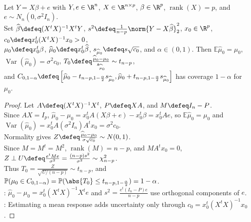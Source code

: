\begin{proposition} \label{prop:linear-model-mean-response-interval} \\
Let $Y=X\beta+e$ with $Y,e\in\R^n$, $X\in\R^{n\times p}$, $\beta\in\R^p$, $\operatorname{rank}(X)=p$, and $e\sim N_n(0,\sigma^2I_n)$.\\
Set $\widehat{\beta}\defeq(X^tX)^{-1}X^tY$, $s^2\defeq\frac{1}{n-p}\norm{Y-X\widehat{\beta}}_2^2$, $x_0\in\R^p$, $c_0\defeq x_0^t(X^tX)^{-1}x_0>0$,\\
$\mu_0\defeq x_0^t\beta$, $\widehat{\mu}_0\defeq x_0^t\widehat{\beta}$, $s_{\widehat{\mu}_0}\defeq s\sqrt{c_0}$, and $\alpha\in(0,1)$. Then $\mathbb{E}\widehat{\mu}_0=\mu_0$, $\operatorname{Var}(\widehat{\mu}_0)=\sigma^2c_0$, $T_0\defeq\frac{\widehat{\mu}_0-\mu_0}{s_{\widehat{\mu}_0}}\sim t_{n-p}$,\\
and $C_{0,1-\alpha}\defeq\left[\widehat{\mu}_0-t_{n-p,1-\frac{\alpha}{2}}s_{\widehat{\mu}_0},\widehat{\mu}_0+t_{n-p,1-\frac{\alpha}{2}}s_{\widehat{\mu}_0}\right]$ has coverage $1-\alpha$ for $\mu_0$.
\begin{proof}
Let $A\defeq(X^tX)^{-1}X^t$, $P\defeq XA$, and $M\defeq I_n-P$.\\
Since $AX=I_p$, $\widehat{\mu}_0-\mu_0=x_0^tA(X\beta+e)-x_0^t\beta=x_0^tAe$, so $\mathbb{E}\widehat{\mu}_0=\mu_0$ and $\operatorname{Var}(\widehat{\mu}_0)=x_0^tA(\sigma^2I_n)A^tx_0=\sigma^2c_0$.\\
Normality gives $Z\defeq\frac{\widehat{\mu}_0-\mu_0}{\sigma\sqrt{c_0}}\sim N(0,1)$.\\
Since $M=M^t=M^2$, $\operatorname{rank}(M)=n-p$, and $MA^tx_0=0$, $Z\perp U\defeq\frac{e^tMe}{\sigma^2}=\frac{(n-p)s^2}{\sigma^2}\sim\chi^2_{n-p}$.\\
Thus $T_0=\frac{Z}{\sqrt{U/(n-p)}}\sim t_{n-p}$, and $\mathbb{P}(\mu_0\in C_{0,1-\alpha})=\mathbb{P}(\abs{T_0}\le t_{n-p,1-\frac{\alpha}{2}})=1-\alpha$.\\
: $\widehat{\mu}_0-\mu_0=x_0^t(X^tX)^{-1}X^te$ and $s^2=\frac{e^t(I_n-P)e}{n-p}$ use orthogonal components of $e$.\\
: Estimating a mean response adds uncertainty only through $c_0=x_0^t(X^tX)^{-1}x_0$.
\end{proof}
\end{proposition}


